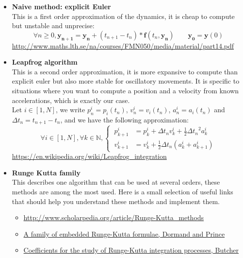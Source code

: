 \documentclass{article}
\newcommand{\myvec}[1]{\ensuremath{\mathbf{#1}}}
\begin{document}
\begin{itemize}
    \item \textbf{Naive method: explicit Euler} \\
    This is a first order approximation of the dynamics, it is cheap to compute but unstable and unprecise:
    \begin{equation*}
        \forall n \ge 0, \myvec{y_{n+1}} = \myvec{y_n} + (t_{n+1} - t_n) * \myvec{f}(t_n, \myvec{y_n}) \quad\quad \myvec{y_0} = \myvec{y}(0)
    \end{equation*}
    \url{http://www.maths.lth.se/na/courses/FMN050/media/material/part14.pdf}

    \item \textbf{Leapfrog algorithm} \\
    This is a second order approximation, it is more expansive to compute than explicit euler but also more stable for oscillatory movements. It is specific to situations where you want to compute a position and a velocity from known accelerations, which is exactly our case.\\
    Let $i \in [1,N]$, we write $p^i_n = p_i(t_n)$, $v^i_n = v_i(t_n)$, $a^i_n = a_i(t_n)$ and ${\Delta t_n = t_{n+1} - t_n}$, and we have the following approximation:
    \begin{equation*}
        \forall i \in [1,N], \forall k \in \mathbb{N}, \left\{\begin{aligned}
            \ p^i_{k+1} & = p^i_k + \Delta t_n v^i_k + \frac{1}{2}{\Delta t_n}^2 a^i_k\\
            \ v^i_{k+1} & = v^i_k + \frac{1}{2}\Delta t_n(a^i_k + a^i_{k+1})
        \end{aligned}\right.
    \end{equation*}
    \url{https://en.wikipedia.org/wiki/Leapfrog_integration}

    \item \textbf{Runge Kutta family} \\
    This describes one algorithm that can be used at several orders, these methods are among the most used. Here is a small selection of useful links that should help you understand these methods and implement them.
    \begin{itemize}
        \item \url{http://www.scholarpedia.org/article/Runge-Kutta_methods}
        \item \href{https://core.ac.uk/download/pdf/81989096.pdf}{A family of embedded Runge-Kutta formulae, Dormand and Prince}
        \item \href{https://www.researchgate.net/publication/231910159_Coefficients_for_the_study_of_Runge-Kutta_integration_processes}{Coefficients for the study of Runge-Kutta integration processes, Butcher}
    \end{itemize}


\end{itemize}
\end{document}
